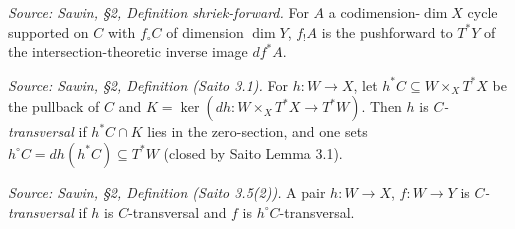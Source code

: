 \begin{definition}
  \label{def:sawin_shriek_forward}
  \textit{Source: Sawin, §2, Definition shriek-forward.}
  For $A$ a codimension-$\dim X$ cycle supported on $C$ with $f_\circ C$ of
  dimension $\dim Y$, $f_! A$ is the pushforward to $T^*Y$ of the
  intersection-theoretic inverse image $df^*A$.
\end{definition}

\begin{definition}
  \label{def:sawin_h_transversal}
  \textit{Source: Sawin, §2, Definition (Saito 3.1).}
  For $h:W\to X$, let $h^*C\subseteq W\times_X T^*X$ be the pullback of $C$ and
  $K=\ker(dh:W\times_X T^*X\to T^*W)$.  Then $h$ is \emph{$C$-transversal} if
  $h^*C\cap K$ lies in the zero-section, and one sets $h^\circ C = dh(h^*C)
  \subseteq T^*W$ (closed by Saito Lemma 3.1).
\end{definition}

\begin{definition}
  \label{def:sawin_pair_transversal}
  \textit{Source: Sawin, §2, Definition (Saito 3.5(2)).}
  A pair $h:W\to X$, $f:W\to Y$ is \emph{$C$-transversal} if $h$ is
  $C$-transversal and $f$ is $h^\circ C$-transversal.
\end{definition}

